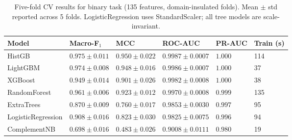 \begin{table}
\caption{Five-fold CV results for binary task (135 features, domain-insulated folds). Mean $\pm$ std reported across 5 folds. LogisticRegression uses StandardScaler; all tree models are scale-invariant.}
\label{tab:cv_binary}
\begin{tabular}{llllll}
\toprule
Model & Macro-F$_1$ & MCC & ROC-AUC & PR-AUC & Train (s) \\
\midrule
HistGB & $0.975\pm0.011$ & $0.950\pm0.022$ & $0.9987\pm0.0007$ & $1.000$ & 114 \\
LightGBM & $0.974\pm0.008$ & $0.948\pm0.016$ & $0.9986\pm0.0007$ & $1.000$ & 37 \\
XGBoost & $0.949\pm0.014$ & $0.901\pm0.026$ & $0.9982\pm0.0008$ & $1.000$ & 38 \\
RandomForest & $0.961\pm0.006$ & $0.923\pm0.012$ & $0.9970\pm0.0008$ & $0.999$ & 135 \\
ExtraTrees & $0.870\pm0.009$ & $0.760\pm0.017$ & $0.9853\pm0.0030$ & $0.997$ & 95 \\
LogisticRegression & $0.908\pm0.016$ & $0.823\pm0.030$ & $0.9825\pm0.0075$ & $0.996$ & 94 \\
ComplementNB & $0.698\pm0.016$ & $0.483\pm0.026$ & $0.9008\pm0.0111$ & $0.980$ & 19 \\
\bottomrule
\end{tabular}
\end{table}
